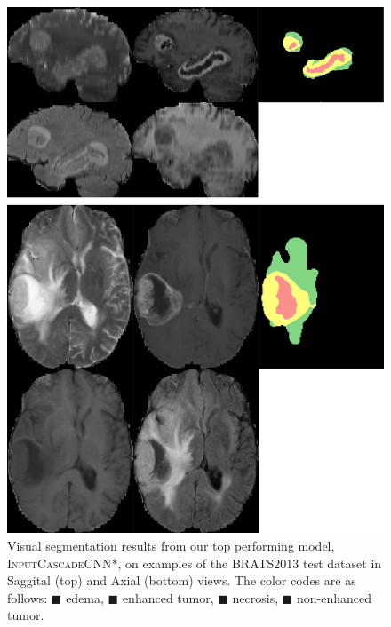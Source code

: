 \documentclass[final,5p,times,twocolumn]{elsarticle}
\begin{document}
{\begin{figure}[tp]
\centering

\includegraphics[width=0.8\linewidth]{challenge_result_310.pdf}

\caption{Visual segmentation results from our top performing model, \textsc{InputCascadeCNN*}, on examples of the BRATS2013 test dataset in Saggital (top) and Axial (bottom) views. The color codes are as follows:  \textcolor[RGB]{135,213,120}{$\blacksquare$} edema, \textcolor[RGB]{225,225,95}{$\blacksquare$} enhanced tumor,
\textcolor[RGB]{246,145,139}{$\blacksquare$} necrosis,
\textcolor[RGB]{124,167,208}{$\blacksquare$} non-enhanced tumor.}
\label{fig:testresults}
\end{figure} 

}
\end{document}
